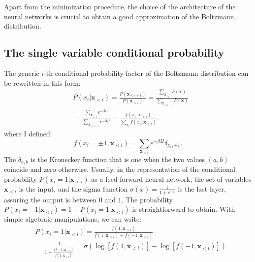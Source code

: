 \documentclass[aps,physrev,10pt,floatfix,reprint]{revtex4-2}
\begin{document}
Apart from the minimization procedure, the choice of the architecture of the neural networks is crucial to obtain a good approximation of the Boltzmann distribution.

\subsection{The single variable conditional probability}
The generic $i$-th conditional probability factor of the Boltzmann distribution can be rewritten in this form: 
\begin{equation}
    \label{eq:chain}
    \begin{split}
    & P\left(x_{i}|\mathbf{x}_{<i}\right)  = 
    \frac{P\left(\mathbf{x}_{<i+1}\right)}{P\left(\mathbf{x}_{<i}\right)}  = 
    \frac{\sum_{\mathbf{x}_{>i}}P\left(\mathbf{x}\right)}{\sum_{\mathbf{x}_{>i-1}}P\left(\mathbf{x}\right)} \\
    &=\frac{\sum_{\mathbf{x}_{>i}}e^{-\beta H}}{\sum_{\mathbf{x}_{>i-1}}e^{-\beta H}}  = 
    \frac{f\left(x_{i},\mathbf{x}_{<i}\right)}{\sum_{x_{i}}f\left(x_{i},\mathbf{x}_{<i}\right)}.
    \end{split}
\end{equation}
where I defined: 
\begin{equation}
f\left(x_{i}=\pm 1,\mathbf{x}_{<i}\right) = \sum_{\mathbf{x}_{>i}}e^{-\beta H}\delta_{x_i, \pm1}.  
\end{equation}
The $\delta_{a,b}$ is the Kronecker function that is one when the two values $(a,b)$ coincide and zero otherwise. Usually, in the representation of the conditional probability $P\left(x_{i}=1|\mathbf{x}_{<i}\right)$ as a feed-forward neural network, the set of variables $\mathbf{x}_{<i}$ is the input, and the sigma function $\sigma(x)=\frac{1}{1+e^{-x}}$ is the last layer, assuring the output is between $0$ and $1$. The probability $P\left(x_{i}=-1|\mathbf{x}_{<i}\right) = 1 - P\left(x_{i}=1|\mathbf{x}_{<i}\right)$ is straightforward to obtain. With simple algebraic manipulations, we can write: 
\begin{equation}
    \label{eq:sigma_log}
    \begin{split}
    & P\left(x_{i}=1|\mathbf{x}_{<i}\right) = 
    \frac{f\left(1,\mathbf{x}_{<i}\right)}{ f\left(1,\mathbf{x}_{<i}\right) + f\left(-1,\mathbf{x}_{<i}\right)} \\
    &=  \frac{1}{ 1 + \frac{f\left(-1,\mathbf{x}_{<i}\right)}{f\left(1,\mathbf{x}_{<i}\right)}}  = \sigma\left(\log\left[f\left(1,\mathbf{x}_{<i}\right)\right]-\log\left[f\left(-1,\mathbf{x}_{<i}\right)\right]\right)
    \end{split}
\end{equation}
\end{document}
